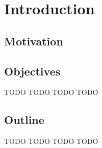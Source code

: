 \chapter{Introduction}\label{chap:introduction}

\section{Motivation}\label{sec:motivation}
\lipsum


\section{Objectives}\label{sec:objectives}
TODO TODO TODO TODO


\section{Outline}\label{sec:study_outline}
TODO TODO TODO TODO

